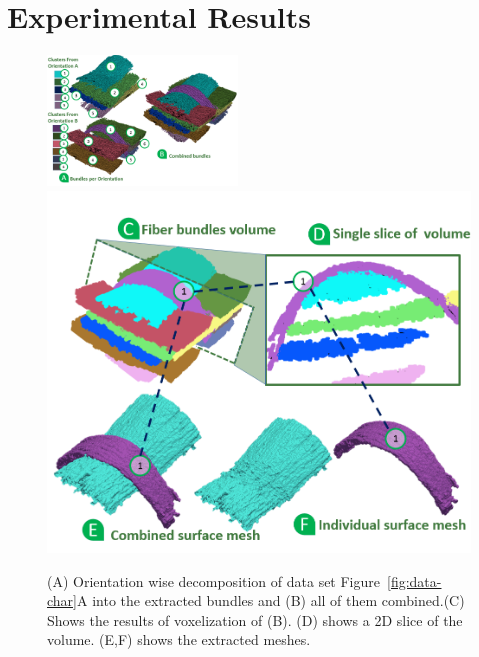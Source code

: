 \section {Experimental Results}
\label {sec:results}
%	
\begin{figure}
\centering
	\includegraphics[width=0.45\textwidth]{imagesMT2014/crop-16/bundles}~ 
	\includegraphics[height=0.35\textwidth]{imagesMT2014/crop-16/vol_mesh.png} 
	\caption{(A) Orientation wise decomposition of data set Figure~\ref{fig:data-char}A into the extracted bundles and (B) all of them combined.(C) Shows the results of voxelization of (B). (D) shows a 2D slice of the volume. (E,F) shows the extracted meshes.}
	\label{fig:crop-16-decomp}
\end{figure}

